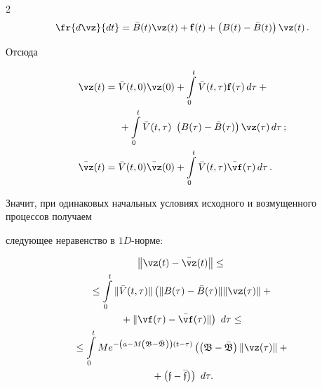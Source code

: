 \begin{multicols}{2}
\begin{equation*}

\fr{d\vz}{dt}=\bar{B}(t)\vz(t) + {\bf f}(t)+\left(B(t)-\bar{B}(t)\right)\vz(t)\,.


\end{equation*}

Отсюда

\begin{align*}

\vz(t)&=\bar{V}(t,0)\vz(0)+\int\limits_0^t \bar{V}(t,\tau){\bf{f}}(\tau) \,

d\tau+{}\\

&\hspace*{5mm}{}+\int\limits_0^t \bar{V}(t,\tau)\ \left(B(\tau) -\bar{B}(\tau)\right)\vz(\tau)\,d\tau\,;

\\

\bar{\vz}(t)&=\bar{V}(t,0)\bar{\vz}(0)+\int\limits_0^t

\bar{V}(t,\tau)\bar{\vf}(\tau) \, d\tau\,.

\end{align*}

Значит, при одинаковых начальных условиях исходного и возмущенного процессов получаем

следующее неравенство в $1D$-норме:

\begin{multline*}

\left\|\vz(t)-\bar{\vz}(t)\right\|\le{}\\

{}\le \int\limits_0^t \|\bar{V}(t,\tau)\|

\left(\| B (\tau)-\bar{B} (\tau)\| \|\vz(\tau)\| +{} \right.\\

\left.{}+\|

\vf(\tau) -\bar{\vf}(\tau)\|\right)\ d\tau \le {} \\

 {}\le \int\limits_0^t M e^{-\left(a - M\left(\mathfrak{B-\bar{B}}\right)\right)(t-\tau)}

\left(\left(\mathfrak{B-\bar{B}}\right) \|\vz(\tau)\| + {}\right.\\

\left.{}+

\left(\mathfrak{f-\bar{f}}\right)\right)\ d\tau.


\end{multline*}




\end{multicols}
